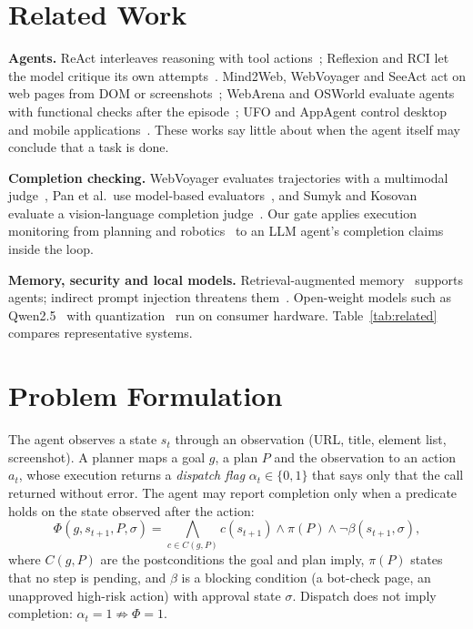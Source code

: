 \documentclass[conference]{IEEEtran}
\begin{document}
\section{Related Work}

\textbf{Agents.} ReAct interleaves reasoning with tool actions~\cite{yao2023react}; Reflexion and RCI let the model critique its own attempts~\cite{shinn2023reflexion,kim2023rci}. Mind2Web, WebVoyager and SeeAct act on web pages from DOM or screenshots~\cite{deng2023mind2web,he2024webvoyager,zheng2024seeact}; WebArena and OSWorld evaluate agents with functional checks after the episode~\cite{zhou2024webarena,xie2024osworld}; UFO and AppAgent control desktop and mobile applications~\cite{zhang2025ufo,zhang2025appagent}. These works say little about when the agent itself may conclude that a task is done.

\textbf{Completion checking.} WebVoyager evaluates trajectories with a multimodal judge~\cite{he2024webvoyager}, Pan et al.\ use model-based evaluators~\cite{pan2024autonomous}, and Sumyk and Kosovan evaluate a vision-language completion judge~\cite{sumyk2025done}. Our gate applies execution monitoring from planning and robotics~\cite{fikes1972planex,pettersson2005execution} to an LLM agent's completion claims inside the loop.

\textbf{Memory, security and local models.} Retrieval-augmented memory~\cite{lewis2020rag,packer2023memgpt} supports agents; indirect prompt injection threatens them~\cite{greshake2023indirect,debenedetti2024agentdojo}. Open-weight models such as Qwen2.5~\cite{yang2024qwen25} with quantization~\cite{lin2024awq} run on consumer hardware. Table~\ref{tab:related} compares representative systems.



\section{Problem Formulation}
\label{sec:problem}

The agent observes a state $s_t$ through an observation (URL, title, element list, screenshot). A planner maps a goal $g$, a plan $P$ and the observation to an action $a_t$, whose execution returns a \emph{dispatch flag} $\alpha_t\in\{0,1\}$ that says only that the call returned without error. The agent may report completion only when a predicate holds on the state observed after the action:
\begin{equation}
\Phi(g,s_{t+1},P,\sigma) = \textstyle\bigwedge_{c\in C(g,P)} c(s_{t+1}) \wedge \pi(P) \wedge \neg\beta(s_{t+1},\sigma),
\label{eq:phi}
\end{equation}
where $C(g,P)$ are the postconditions the goal and plan imply, $\pi(P)$ states that no step is pending, and $\beta$ is a blocking condition (a bot-check page, an unapproved high-risk action) with approval state $\sigma$. Dispatch does not imply completion: $\alpha_t=1\not\Rightarrow\Phi=1$.
\end{document}
